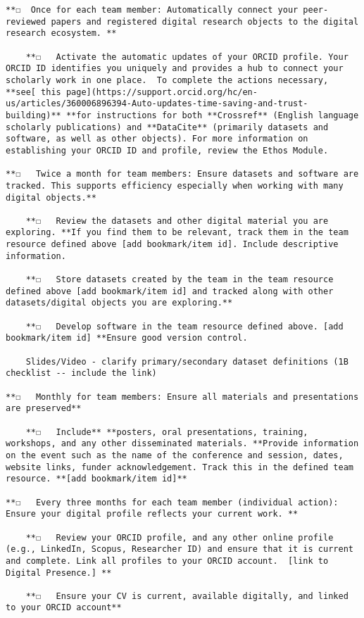 \documentclass[
  letterpaper,
  DIV=11,
  numbers=noendperiod]{scrreport}
\begin{document}
\begin{verbatim}
**☐  Once for each team member: Automatically connect your peer-reviewed papers and registered digital research objects to the digital research ecosystem. **

    **☐   Activate the automatic updates of your ORCID profile. Your ORCID ID identifies you uniquely and provides a hub to connect your scholarly work in one place.  To complete the actions necessary, **see[ this page](https://support.orcid.org/hc/en-us/articles/360006896394-Auto-updates-time-saving-and-trust-building)** **for instructions for both **Crossref** (English language scholarly publications) and **DataCite** (primarily datasets and software, as well as other objects). For more information on establishing your ORCID ID and profile, review the Ethos Module. 

**☐   Twice a month for team members: Ensure datasets and software are tracked. This supports efficiency especially when working with many digital objects.**

    **☐   Review the datasets and other digital material you are exploring. **If you find them to be relevant, track them in the team resource defined above [add bookmark/item id]. Include descriptive information. 

    **☐   Store datasets created by the team in the team resource defined above [add bookmark/item id] and tracked along with other datasets/digital objects you are exploring.**

    **☐   Develop software in the team resource defined above. [add bookmark/item id] **Ensure good version control. 

    Slides/Video - clarify primary/secondary dataset definitions (1B checklist -- include the link)

**☐   Monthly for team members: Ensure all materials and presentations are preserved**

    **☐   Include** **posters, oral presentations, training, workshops, and any other disseminated materials. **Provide information on the event such as the name of the conference and session, dates, website links, funder acknowledgement. Track this in the defined team resource. **[add bookmark/item id]**

**☐   Every three months for each team member (individual action): Ensure your digital profile reflects your current work. **

    **☐   Review your ORCID profile, and any other online profile (e.g., LinkedIn, Scopus, Researcher ID) and ensure that it is current and complete. Link all profiles to your ORCID account.  [link to Digital Presence.] **

    **☐   Ensure your CV is current, available digitally, and linked to your ORCID account**
\end{verbatim}
\end{document}
